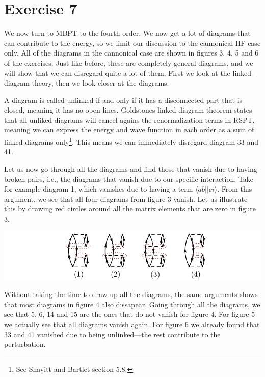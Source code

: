 \documentclass[a4paper, 11pt, notitlepage, english]{article}
\newcommand{\brakket}[2]{\langle #1 || #2 \rangle}
\begin{document}
\clearpage

\section*{Exercise 7}

We now turn to MBPT to the fourth order. We now get a lot of diagrams that can contribute to the energy, so we limit our discussion to the cannonical HF-case only. All of the diagrams in the cannonical case are shown in figures 3, 4, 5 and 6 of the exercises. Just like before, these are completely general diagrams, and we will show that we can disregard quite a lot of them. First we look at the linked-diagram theory, then we look closer at the diagrams. 

A diagram is called unlinked if and only if it has a disconnected part that is closed, meaning it has no open lines. Goldstones linked-diagram theorem states that all unliked diagrams will cancel agains the renormalization terms in RSPT, meaning we can express the energy and wave function in each order as a sum of linked diagrams only\footnote{See Shavitt and Bartlet section 5.8.}. This means we can immediately disregard diagram 33 and 41.

Let us now go through all the diagrams and find those that vanish due to having broken pairs, i.e., the diagrams that vanish due to our specific interaction. Take for example diagram 1, which vanishes due to having a term $\brakket{ab}{ci}$. From this argument, we see that all four diagrams from figure 3 vanish. Let us illustrate this by drawing red circles around all the matrix elements that are zero in figure 3.

\includegraphics[width=\textwidth]{project2_6}

Without taking the time to draw up all the diagrams, the same arguments shows that most diagrams in figure 4 also dissapear. Going through all the diagrams, we see that 5, 6, 14 and 15 are the ones that do not vanish for figure 4. For figure 5 we actually see that all diagrams vanish again. For figure 6 we already found that 33 and 41 vanished due to being unlinked---the rest contribute to the perturbation.
\end{document}
